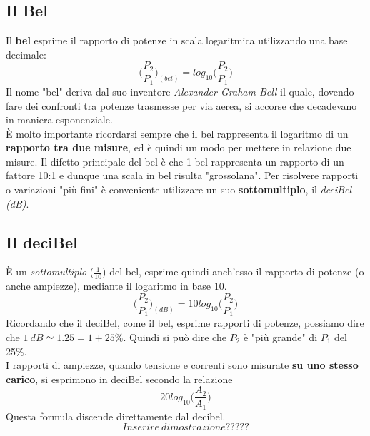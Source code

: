 \documentclass[a4paper,11pt]{report}
\begin{document}
\subsection{Il Bel}
Il \textbf{bel} esprime il rapporto di potenze in scala logaritmica utilizzando una base decimale: $$\Bigg(\frac{P_{2}}{P_{1}}\Bigg)_{(bel)} = log_{10}\Bigg(\frac{P_{2}}{P_{1}}\Bigg)$$
Il nome "bel" deriva dal suo inventore \textit{Alexander Graham-Bell} il quale, dovendo fare dei confronti tra potenze trasmesse per via aerea, si accorse che decadevano in maniera esponenziale.\\
È molto importante ricordarsi sempre che il bel rappresenta il logaritmo di un \textbf{rapporto tra due misure}, ed è quindi un modo per mettere in relazione due misure. Il difetto principale del bel è che 1 bel rappresenta un rapporto di un fattore 10:1 e dunque una scala in bel risulta "grossolana". Per risolvere\footnotemark {} rapporti o variazioni "più fini" è conveniente utilizzare un suo \textbf{sottomultiplo}, il \textit{deciBel (dB)}.
\subsection{Il deciBel}
È un \textit{sottomultiplo} ($\frac{1}{10}$) del bel, esprime quindi anch'esso il rapporto di potenze (o anche ampiezze), mediante il logaritmo in base 10. $$\Bigg(\frac{P_{2}}{P_{1}}\Bigg)_{(dB)} = 10log_{10}\Bigg(\frac{P_{2}}{P_{1}}\Bigg)$$
Ricordando che il deciBel, come il bel, esprime rapporti di potenze, possiamo dire che $ 1\ dB \simeq 1.25 = 1 + 25\% $. Quindi si può dire che $P_{2}$ è "più grande" di $P_{1}$ del 25\%.\\
I rapporti di ampiezze, quando tensione e correnti sono misurate \textbf{su uno stesso carico}, si esprimono in deciBel secondo la relazione $$ 20log_{10}\Bigg(\frac{A_{2}}{A_{1}}\Bigg) $$
Questa formula discende direttamente dal decibel.$$Inserire\  dimostrazione?????$$
\end{document}
